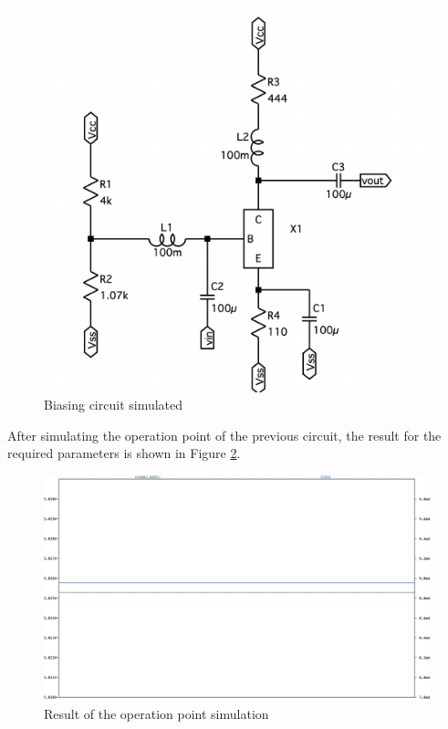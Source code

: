 \begin{figure}[H]
    \centering
    \includegraphics*[scale = 0.3]{Images/SIMBiasCircuit.png}
    \caption{Biasing circuit simulated}
    \label{fig:SIMBiasCircuit}
\end{figure}

After simulating the operation point of the previous circuit, the result for the required parameters is shown in Figure \ref{fig:SIMBias}.

\begin{figure}[H]
    \centering
    \includegraphics*[scale = 0.3]{Images/SIMBias.png}
    \caption{Result of the operation point simulation}
    \label{fig:SIMBias}
\end{figure}

